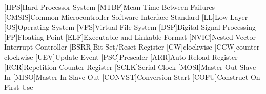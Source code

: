 \begin{acronym}
    [HPS]{Hard Processor System}
    [MTBF]{Mean Time Between Failures}
    [CMSIS]{Common Microcontroller Software Interface Standard}
    [LL]{Low-Layer}
    [OS]{Operating System}
    [VFS]{Virtual File System}
    [DSP]{Digital Signal Processing}
    [FP]{Floating Point}
    [ELF]{Executable and Linkable Format}
    [NVIC]{Nested Vector Interrupt Controller}
    [BSRR]{Bit Set/Reset Register}
    [CW]{clockwise}
    [CCW]{counter-clockwise}
    [UEV]{Update Event}
    [PSC]{Prescaler}
    [ARR]{Auto-Reload Register}
    [RCR]{Repetition Counter Register}
    [SCLK]{Serial Clock}
    [MOSI]{Master-Out Slave-In}
    [MISO]{Master-In Slave-Out}
    [CONVST]{Conversion Start}
    [COFU]{Construct On First Use}
\end{acronym}